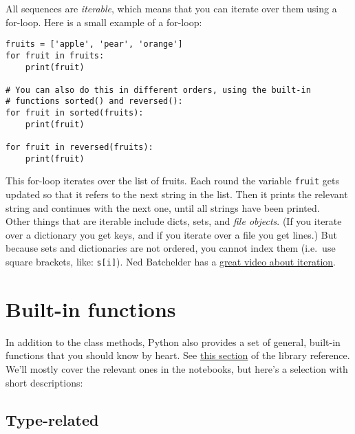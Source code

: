 \documentclass[12pt]{book}
\begin{document}
All sequences are \emph{iterable}, which means that you can iterate over them using a for-loop. Here is a small example of a for-loop:

\begin{lstlisting}
fruits = ['apple', 'pear', 'orange']
for fruit in fruits:
    print(fruit)

# You can also do this in different orders, using the built-in
# functions sorted() and reversed():
for fruit in sorted(fruits):
    print(fruit)

for fruit in reversed(fruits):
    print(fruit)
\end{lstlisting}

This for-loop iterates over the list of fruits. Each round the variable \texttt{fruit}
gets updated so that it refers to the next string in the list. Then it prints the
relevant string and continues with the next one, until all strings have been printed.\\

Other things that are iterable include dicts, sets, and \emph{file objects}. (If you iterate
over a dictionary you get keys, and if you iterate over a file you get lines.) But because
sets and dictionaries are not ordered, you cannot index them (i.e.\ use square brackets, like: \texttt{s[i]}). Ned Batchelder has a \href{http://nedbatchelder.com/text/iter.html}{great video about iteration}.

\section{Built-in functions}
In addition to the class methods, Python also provides a set of general, built-in functions that you should know by heart. See \href{https://docs.python.org/3/library/functions.html}{this section} of the library reference. We'll mostly cover the relevant ones in the notebooks, but here's a selection with short descriptions:

\subsection{Type-related}
\end{document}
